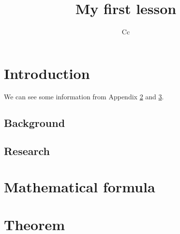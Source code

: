 \documentclass[12pt]{article}
\begin{document}
\tableofcontents
\title{My first lesson}
\author{Cc}
\maketitle

\section{Introduction}
We can see some information from Appendix \ref{app:mafor} and \ref{app:theo}.
\subsection{Background}
\subsection{Research}

\newpage
\appendix
\appendixpage
\addappheadtotoc
\section{Mathematical formula}\label{app:mafor}
\section{Theorem}\label{app:theo}
\end{document}
